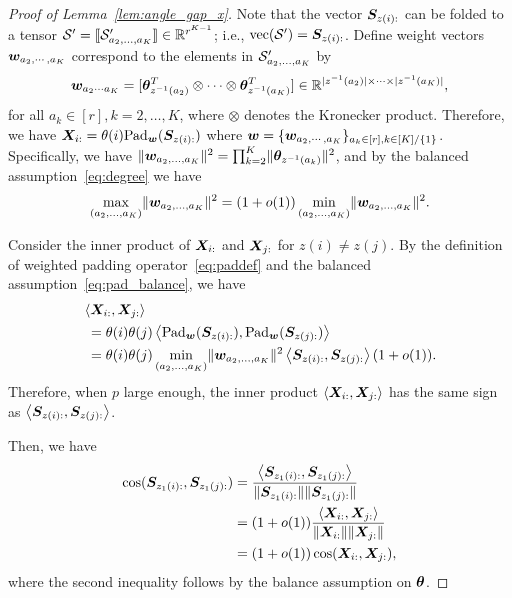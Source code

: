 \documentclass[journal]{IEEEtran}
\theoremstyle{definition}
\theoremstyle{definition}
\newcommand{\ang}[1]{\left\langle#1\right\rangle}
\begin{document}
\begin{proof}[Proof of Lemma~\ref{lem:angle_gap_x}] 

Note that the vector $\bm S_{z(i):}$ can be folded to a tensor $\mathcal{S}' =\llbracket \mathcal{S}'_{a_2,\ldots,a_K} \rrbracket \in \mathbb{R}^{r^{K-1}}$; i.e., $\text{vec}(\mathcal{S}') = \bm S_{z(i):}$. Define weight vectors $\bm{w}_{a_2, \cdots, a_K}$ correspond to the elements in $\mathcal{S}'_{a_2,\ldots,a_K}$ by
\begin{equation}
    \bm{w}_{a_2 \cdots a_K} = [ \boldsymbol{\theta}_{z^{-1} (a_2)}^T \otimes \cdots \otimes \boldsymbol{\theta}_{z^{-1} (a_K)}^T] \in \mathbb{R}^{|z^{-1} (a_2)| \times \cdots \times |z^{-1} (a_K)|},
\end{equation}
for all $a_k \in [r], k = 2,\ldots, K$, where $\otimes$ denotes the Kronecker product. Therefore, we have  $\bm X_{i:} = \theta(i) \text{Pad}_{\bm{w}}(\bm S_{z(i):})$ where $\bm{w} = \{ \bm{w}_{a_2, \cdots, a_K}\}_{a_k \in [r], k\in [K]/\{1\}}$. Specifically, we have $\lVert\bm{w}_{a_2, \ldots, a_K}\rVert^2 = \prod_{k = 2}^K \lVert \boldsymbol{\theta}_{z^{-1}(a_k)}\rVert^2$, and by the balanced assumption~\eqref{eq:degree} we have 
\small
\begin{equation}\label{eq:pad_balance}
    \max_{(a_2,\ldots, a_K)} \onormSize{}{\mw_{a_2,\ldots, a_K}}^2 = (1 + o(1))  \min_{(a_2,\ldots, a_K)} \onormSize{}{\mw_{a_2,\ldots, a_K}}^2.
\end{equation}
\normalsize

Consider the inner product of $\bm X_{i:}$ and $\bm X_{j:}$ for $z(i) \neq z(j)$. By the definition of weighted padding operator~\eqref{eq:paddef} and the balanced assumption~\eqref{eq:pad_balance}, we have 
\begin{align}
    &\ang{\mX_{i:},\mX_{j:}} \\
    &\ = \theta(i) \theta(j) \ang{ \pad_{\mw}(\mS_{z(i):}), \pad_{\mw}(\mS_{z(j):} )}\\
    &\ = \theta(i) \theta(j) \min_{(a_2,\ldots, a_K)} \onormSize{}{\mw_{a_2,\ldots, a_K}}^2 \ang{\mS_{z(i):}, \mS_{z(j):}}(1 + o(1)).
\end{align}
Therefore, when $p$ large enough, the inner product $\ang{\mX_{i:},\mX_{j:}} $ has the same sign as $\ang{\mS_{z(i):}, \mS_{z(j):}}$. 

{
 Then, we have 
\begin{align}
    \cos (\mS_{z_1(i):}, \mS_{z_1(j):}) &= \frac{ \ang{  \mS_{z_1(i):}, \mS_{z_1(j):} }}{ \onormSize{}{\mS_{z_1(i):}} \onormSize{}{\mS_{z_1(j):}} } \\
    &= (1+o(1))\frac{ \ang{  \mX_{i:}, \mX_{j:} }}{ \onormSize{}{ \mX_{i:}} \onormSize{}{ \mX_{j:}} }\\
    &= (1 + o(1)) \cos(\mX_{i:}, \mX_{j:}),
\end{align}
where the second inequality follows by the balance assumption on $\boldsymbol{\theta}$.

}
\end{proof}
\end{document}
